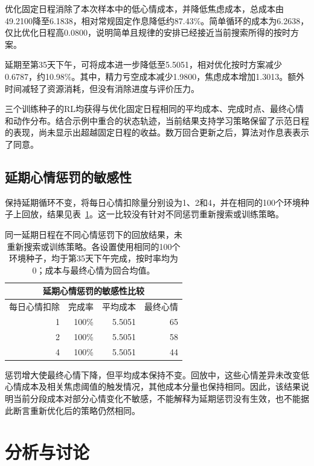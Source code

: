 \documentclass[journal]{IEEEtran}
\begin{document}
优化固定日程消除了本次样本中的低心情成本，并降低焦虑成本，总成本由49.2100降至6.1838，相对常规固定作息降低约87.43\%。简单循环的成本为6.2638，仅比优化日程高0.0800，说明简单且规律的安排已经接近当前搜索所得的按时方案。

延期至第35天下午，可将成本进一步降低至5.5051，相对优化按时方案减少0.6787，约10.98\%。其中，精力亏空成本减少1.9800，焦虑成本增加1.3013。额外时间减轻了资源消耗，但没有消除进度与评价压力。

三个训练种子的RL均获得与优化固定日程相同的平均成本、完成时点、最终心情和动作分布。结合示例中重合的状态轨迹，当前结果支持学习策略保留了示范日程的表现，尚未显示出超越固定日程的收益。数万回合更新之后，算法对作息表表示了同意。

\subsection{延期心情惩罚的敏感性}

保持延期循环不变，将每日心情扣除量分别设为1、2和4，并在相同的100个环境种子上回放，结果见表~\ref{tab:sensitivity}。这一比较没有针对不同惩罚重新搜索或训练策略。

\begin{table}[ht]
\centering
\small
\setlength{\tabcolsep}{3pt}
\begin{tabular*}{\columnwidth}{@{\extracolsep{\fill}}rrrr@{}}
\multicolumn{4}{c}{\textsc{延期心情惩罚的敏感性比较}} \\
\hline\hline
每日心情扣除 & 完成率 & 平均成本 & 最终心情\\
\hline
1 & 100\% & 5.5051 & 65\\
2 & 100\% & 5.5051 & 58\\
4 & 100\% & 5.5051 & 44\\
\hline\hline
\end{tabular*}
\caption{同一延期日程在不同心情惩罚下的回放结果，未重新搜索或训练策略。各设置使用相同的100个环境种子，均于第35天下午完成，按时率均为0；成本与最终心情为回合均值。}
\label{tab:sensitivity}
\end{table}

惩罚增大使最终心情下降，但平均成本保持不变。回放中，这些心情差异未改变低心情成本及相关焦虑阈值的触发情况，其他成本分量也保持相同。因此，该结果说明当前分段成本对部分心情变化不敏感，不能解释为延期惩罚没有生效，也不能据此断言重新优化后的策略仍然相同。
\section{分析与讨论}
\end{document}
